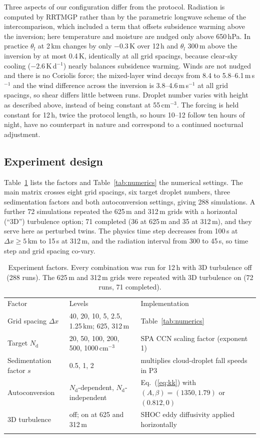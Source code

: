 \documentclass[acp, manuscript]{copernicus}
\newcommand{\Nd}{N_\mathrm{d}}
\newcommand{\dx}{\Delta x}
\newcommand{\cmthree}{\mathrm{cm^{-3}}}
\begin{document}
Three aspects of our configuration differ from the protocol. Radiation is computed by RRTMGP rather than by the parametric longwave scheme of the intercomparison, which included a term that offsets subsidence warming above the inversion; here temperature and moisture are nudged only above 650\,hPa. In practice $\theta_l$ at 2\,km changes by only $-0.3$\,K over 12\,h and $\theta_l$ 300\,m above the inversion by at most 0.4\,K, identically at all grid spacings, because clear-sky cooling ($-2.6$\,K\,d$^{-1}$) nearly balances subsidence warming. Winds are not nudged and there is no Coriolis force; the mixed-layer wind decays from 8.4 to 5.8--6.1\,m\,s$^{-1}$ and the wind difference across the inversion is 3.8--4.6\,m\,s$^{-1}$ at all grid spacings, so shear differs little between runs. Droplet number varies with height as described above, instead of being constant at 55\,$\cmthree$. The forcing is held constant for 12\,h, twice the protocol length, so hours 10--12 follow ten hours of night, have no counterpart in nature and correspond to a continued nocturnal adjustment.

\subsection{Experiment design}

Table~\ref{tab:design} lists the factors and Table~\ref{tab:numerics} the numerical settings. The main matrix crosses eight grid spacings, six target droplet numbers, three sedimentation factors and both autoconversion settings, giving 288 simulations. A further 72 simulations repeated the 625\,m and 312\,m grids with a horizontal (``3D'') turbulence option; 71 completed (36 at 625\,m and 35 at 312\,m), and they serve here as perturbed twins. The physics time step decreases from 100\,s at $\dx\geq5$\,km to 15\,s at 312\,m, and the radiation interval from 300 to 45\,s, so time step and grid spacing co-vary.

\begin{table}[t]
\caption{Experiment factors. Every combination was run for 12\,h with 3D turbulence off (288 runs). The 625\,m and 312\,m grids were repeated with 3D turbulence on (72 runs, 71 completed).}\label{tab:design}
\begin{tabular}{lll}
\tophline
Factor & Levels & Implementation \\
\middlehline
Grid spacing $\dx$ & 40, 20, 10, 5, 2.5, 1.25\,km; 625, 312\,m & Table~\ref{tab:numerics} \\
Target $\Nd$ & 20, 50, 100, 200, 500, 1000\,$\cmthree$ & SPA CCN scaling factor (exponent 1) \\
Sedimentation factor $s$ & 0.5, 1, 2 & multiplies cloud-droplet fall speeds in P3 \\
Autoconversion & $\Nd$-dependent, $\Nd$-independent & Eq.~(\ref{eq:kk}) with $(A,\beta)=(1350,1.79)$ or $(0.812,0)$ \\
3D turbulence & off; on at 625 and 312\,m & SHOC eddy diffusivity applied horizontally \\
\bottomhline
\end{tabular}
\end{table}
\end{document}
